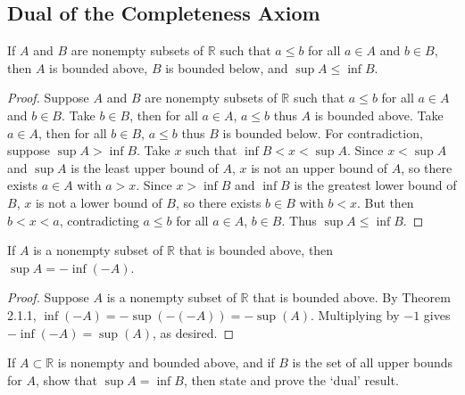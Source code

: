 \subsection{Dual of the Completeness Axiom}

\begin{tcolorbox}[title=Problem 1, breakable]
    If $A$ and $B$ are nonempty subsets of $\mathbb{R}$
    such that $a \le b$ for all $a \in A$ and $b \in B$, then 
    $A$ is bounded above, $B$ is bounded below,
    and $\sup A \le \inf B$.
\end{tcolorbox}

\begin{proof}
    Suppose $A$ and $B$ are nonempty subsets of $\mathbb{R}$
        such that $a \le b$ for all $a \in A$ and $b \in B$.
    Take $b \in B$, then for all $a \in A$, $a \le b$ thus $A$ is bounded above.
    Take $a \in A$, then for all $b \in B$, $a \le b$ thus $B$ is bounded below.
    For contradiction, suppose $\sup A > \inf B$.
    Take $x$ such that $\inf B < x < \sup A$.
    Since $x < \sup A$ and $\sup A$ is the least upper bound of $A$,
        $x$ is not an upper bound of $A$, so there exists $a \in A$ with $a > x$.
    Since $x > \inf B$ and $\inf B$ is the greatest lower bound of $B$,
        $x$ is not a lower bound of $B$, so there exists $b \in B$ with $b < x$.
    But then $b < x < a$, contradicting $a \le b$ for all $a \in A$, $b \in B$.
    Thus $\sup A \le \inf B$.
\end{proof}

\begin{tcolorbox}[title=Problem 2, breakable]
    If $A$ is a nonempty subset of $\mathbb{R}$
        that is bounded above, then $\sup A = -\inf(-A)$.
\end{tcolorbox}

\begin{proof}
    Suppose $A$ is a nonempty subset of $\mathbb{R}$
        that is bounded above.
    By Theorem 2.1.1, $\inf(-A) = -\sup(-(-A)) = -\sup(A)$.
    Multiplying by $-1$ gives $-\inf(-A) = \sup(A)$, as desired.
\end{proof}

\begin{tcolorbox}[title=Problem 3, breakable]
    If $A \subset \mathbb{R}$ is nonempty and bounded above, and if $B$
    is the set of all upper bounds for $A$, show that $\sup A = \inf B$, then state and prove 
    the `dual' result.
\end{tcolorbox}

